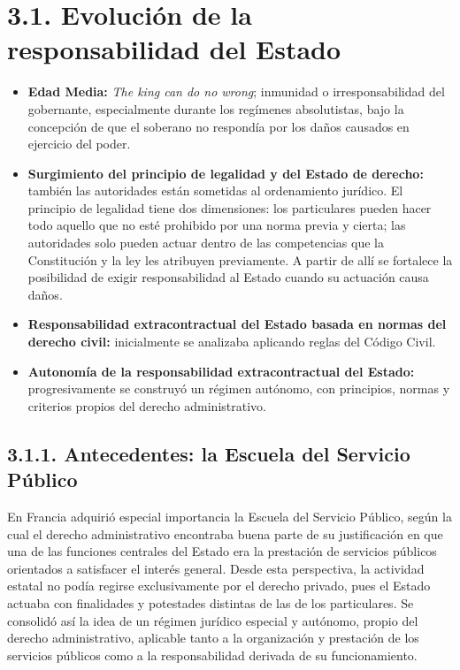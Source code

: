 
\section{3.1. Evolución de la responsabilidad del Estado}
\begin{itemize}
\item \textbf{Edad Media:} \textit{The king can do no wrong}; inmunidad o irresponsabilidad del gobernante, especialmente durante los regímenes absolutistas, bajo la concepción de que el soberano no respondía por los daños causados en ejercicio del poder.
\item \textbf{Surgimiento del principio de legalidad y del Estado de derecho:} también las autoridades están sometidas al ordenamiento jurídico. El principio de legalidad tiene dos dimensiones: los particulares pueden hacer todo aquello que no esté prohibido por una norma previa y cierta; las autoridades solo pueden actuar dentro de las competencias que la Constitución y la ley les atribuyen previamente. A partir de allí se fortalece la posibilidad de exigir responsabilidad al Estado cuando su actuación causa daños.
\item \textbf{Responsabilidad extracontractual del Estado basada en normas del derecho civil:} inicialmente se analizaba aplicando reglas del Código Civil.
\item \textbf{Autonomía de la responsabilidad extracontractual del Estado:} progresivamente se construyó un régimen autónomo, con principios, normas y criterios propios del derecho administrativo.
\end{itemize}
\subsection{3.1.1. Antecedentes: la Escuela del Servicio Público}
En Francia adquirió especial importancia la Escuela del Servicio Público, según la cual el derecho administrativo encontraba buena parte de su justificación en que una de las funciones centrales del Estado era la prestación de servicios públicos orientados a satisfacer el interés general. Desde esta perspectiva, la actividad estatal no podía regirse exclusivamente por el derecho privado, pues el Estado actuaba con finalidades y potestades distintas de las de los particulares. Se consolidó así la idea de un régimen jurídico especial y autónomo, propio del derecho administrativo, aplicable tanto a la organización y prestación de los servicios públicos como a la responsabilidad derivada de su funcionamiento.

